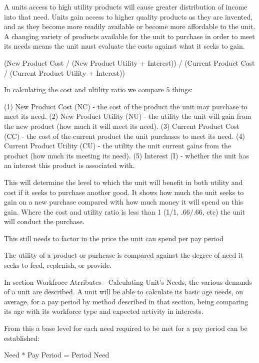 A units access to high utility products will cause greater distribution of income into that need. Units gain access to higher quality products as they are invented, and as they become more readily available or become more affordable to the unit. A changing variety of products available for the unit to purchase in order to meet its needs means the unit must evaluate the costs against what it seeks to gain. 

(New Product Cost / (New Product Utility + Interest)) / (Current Product Cost / (Current Product Utility + Interest))

In calculating the cost and ultility ratio we compare 5 things:

(1) New Product Cost (NC) - the cost of the product the unit may purchase to meet its need.
(2) New Product Utility (NU) - the utility the unit will gain from the new product (how much it will meet its need).
(3) Current Product Cost (CC) - the cost of the current product the unit purchases to meet its need.
(4) Current Product Utility (CU) - the utility the unit current gains from the product (how much its meeting its need).
(5) Interest (I) - whether the unit has an interest this product is associated with.

This will determine the level to which the unit will benefit in both utility and cost if it seeks to purchase another good. It shows how much the unit seeks to gain on a new purchase compared with how much money it will spend on this gain. Where the cost and utility ratio is less than 1 (1/1, .66/.66, etc) the unit will conduct the purchase.


  
This still needs to factor in the price the unit can spend per pay period

The utility of a product or purhcase is compared against the degree of need it seeks to feed, replenish, or provide.

In section Workfroce Atrributes - Calculating Unit's Needs, the various demands of a unit are described. A unit will be able to calculate its basic age needs, on average, for a pay period by method described in that section, being comparing its age with its workforce type and expected activity in interests.  
 
From this a base level for each need required to be met for a pay period can be established:

Need * Pay Period = Period Need


